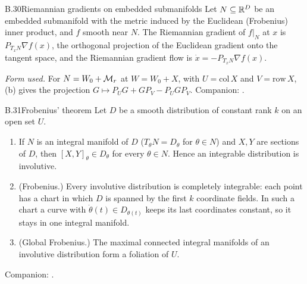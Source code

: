 \begin{auxresult}{B.30}{Riemannian gradients on embedded submanifolds}{\citep[\S3.6]{xabsil2008optimization}}
Let $N\subseteq\mathbb{R}^D$ be an embedded submanifold with the metric induced by the Euclidean (Frobenius) inner product, and
$f$ smooth near $N$. The Riemannian gradient of $f|_N$ at $x$ is $P_{T_xN}\nabla f(x)$, the orthogonal projection of the
Euclidean gradient onto the tangent space, and the Riemannian gradient flow is $\dot x=-P_{T_xN}\nabla f(x)$.
\end{auxresult}
\noindent\emph{Form used.} For $N=W_0+\mathcal{M}_r$ at $W=W_0+X$, with $U=\mathrm{col}\,X$ and $V=\mathrm{row}\,X$,
(b) gives the projection $G\mapsto P_UG+GP_V-P_UGP_V$. Companion: .

\begin{auxresult}{B.31}{Frobenius' theorem}{\citep[Prop.~19.3, Thms~19.12 and 19.21]{xlee2013introduction}}
Let $D$ be a smooth distribution of constant rank $k$ on an open set $U$.
\begin{enumerate}[label=(\alph*)]
  \item If $N$ is an integral manifold of $D$ ($T_\theta N=D_\theta$ for $\theta\in N$) and $X,Y$ are sections of $D$,
    then $[X,Y]_\theta\in D_\theta$ for every $\theta\in N$. Hence an integrable distribution is involutive.
  \item (Frobenius.) Every involutive distribution is completely integrable: each point has a chart in which $D$ is
    spanned by the first $k$ coordinate fields. In such a chart a curve with $\dot\theta(t)\in D_{\theta(t)}$ keeps its last
    coordinates constant, so it stays in one integral manifold.
  \item (Global Frobenius.) The maximal connected integral manifolds of an involutive distribution form a foliation of
    $U$.
\end{enumerate}
\end{auxresult}
\noindent Companion: .

